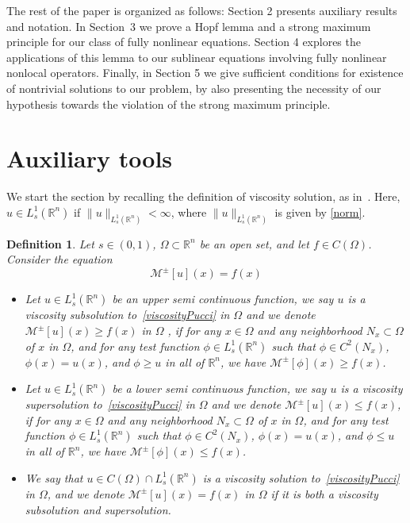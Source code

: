 \documentclass[11pt]{article}
\newcommand{\R}{\mathbb{R}}
\newtheorem{defn}{Definition}
\begin{document}
The rest of the paper is organized as follows: Section 2 presents auxiliary results and notation. In Section~3 we prove a Hopf lemma and a strong maximum principle for our class of fully nonlinear equations. Section 4 explores the applications of this lemma to our sublinear equations  involving fully nonlinear nonlocal operators. Finally, in Section 5 we give sufficient conditions for existence of nontrivial solutions to our problem, by also presenting the necessity of our hypothesis towards the violation of the strong maximum principle.




\section{Auxiliary tools}\label{auxiliary}

We start the section by recalling the definition of viscosity solution, as in~\cite{fernandez2024integro}.
Here, \(u\in L_{s}^{1}(\mathbb{R}^{n})\) if $  \|u\|_{L^{1}_{s}(\R^n)}<\infty$, where $\|u\|_{L^{1}_{s}(\R^n)}$ is given by \eqref{norm}.
\begin{defn}\label{def-visc}
    Let \(s\in(0,1)\), \(\Omega\subset\mathbb{R}^{n}\) be an open set, and let \(f\in C(\Omega)\). Consider the equation
    \begin{equation}\label{viscosityPucci}
        \mathcal{M}^{\pm}[u](x) = f(x)
    \end{equation}
    \begin{itemize}
        \item Let \(u\in L_{s}^{1}(\mathbb{R}^{n})\) be an upper semi continuous function, we say \(u\) is a viscosity subsolution to~\eqref{viscosityPucci} in \(\Omega\) and we denote \(\mathcal{M}^{\pm}[u](x)\geq f(x)\) in \(\Omega\) , if for any \(x\in\Omega\) and any neighborhood \(N_{x}\subset\Omega\) of \(x\) in \(\Omega\), and for any test function \(\phi\in L^{1}_{s}(\mathbb{R}^{n})\) such that \(\phi\in C^{2}(N_x)\), \(\phi(x) = u(x)\), and \(\phi\geq u\) in all of \(\mathbb{R}^{n}\), we have \(\mathcal{M}^{\pm}[\phi](x)\geq f(x)\).
        \item Let \(u\in L_{s}^{1}(\mathbb{R}^{n})\) be a lower semi continuous function, we say \(u\) is a viscosity supersolution to~\eqref{viscosityPucci} in \(\Omega\) and we denote \(\mathcal{M}^{\pm}[u](x)\leq f(x)\), if for any \(x\in\Omega\) and any neighborhood \(N_{x}\subset\Omega\) of \(x\) in \(\Omega\), and for any test function \(\phi\in L^{1}_{s}(\mathbb{R}^{n})\) such that \(\phi\in C^{2}(N_x)\), \(\phi(x) = u(x)\), and \(\phi\leq u\) in all of \(\mathbb{R}^{n}\), we have \(\mathcal{M}^{\pm}[\phi](x)\leq f(x)\). 
        \item We say that \(u\in C(\Omega)\cap L_{s}^{1}(\mathbb{R}^{n})\) is a viscosity solution to~\eqref{viscosityPucci} in \(\Omega\), and we denote \(\mathcal{M}^{\pm}[u](x)=f(x)\) in \(\Omega\) if it is both a viscosity subsolution and supersolution.
    \end{itemize}
\end{defn}
\end{document}
